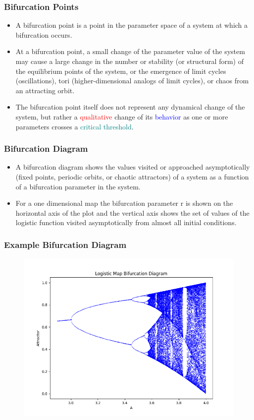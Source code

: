 \documentclass[
	11pt, %
	aspectratio=169, %
]{beamer}
\begin{document}
\begin{frame}
	\frametitle{Bifurcation Points}
    \begin{itemize}
        \item A bifurcation point is a point in the parameter space of a system at which a bifurcation occurs. \pause
        \item At a bifurcation point, a small change of the parameter value of the system may cause a large change in the number or stability (or structural form) of the equilibrium points of the system, or the emergence of limit cycles (oscillations), tori (higher-dimensional analogs of limit cycles), or chaos from an attracting orbit. \pause
        \item The bifurcation point itself does not represent any dynamical change of the system, but rather a \textcolor{red}{qualitative} change of its \textcolor{blue}{behavior} as one or more parameters crosses a \textcolor{teal}{critical threshold}.
    \end{itemize}
\end{frame}


\begin{frame}
	\frametitle{Bifurcation Diagram}
    \begin{itemize}
        \item A bifurcation diagram shows the values visited or approached asymptotically (fixed points, periodic orbits, or chaotic attractors) of a system as a function of a bifurcation parameter in the system. \pause
        \item For a one dimensional map the bifurcation parameter r is shown on the horizontal axis of the plot and the vertical axis shows the set of values of the logistic function visited asymptotically from almost all initial conditions.
    \end{itemize}
\end{frame}


\begin{frame}
	\frametitle{Example Bifurcation Diagram}
    \begin{figure}
        \includegraphics[width=0.6\linewidth]{logistic_bifurcation_diagram.png}
    \end{figure}
\end{frame}
\end{document}

